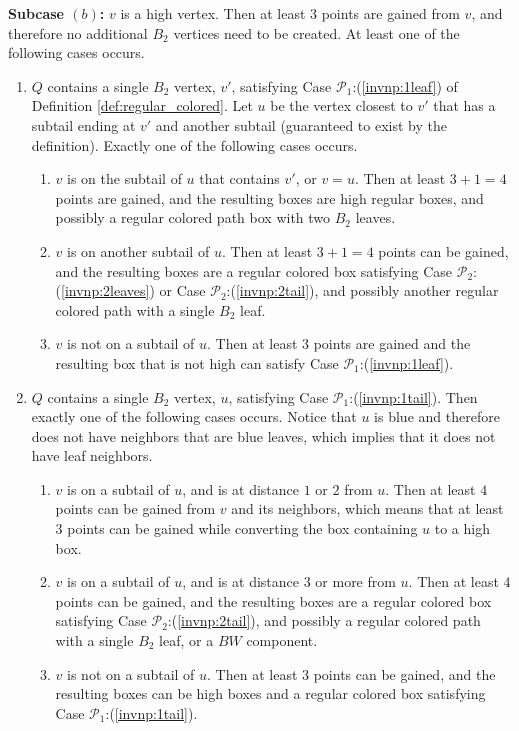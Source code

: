 \documentclass[11pt]{article}
\def\dnsitem{\vspace{-7pt}\item}
\theoremstyle{definition}
\def\propbr{\mathcal{P}_1}
\def\propbbr{\mathcal{P}_2}
\begin{document}
\smallskip
\par\noindent
{\bf Subcase $(b)$:}
$v$ is a high vertex. Then at least $3$ points are gained from $v$, and therefore no additional $B_2$ vertices need to be created. At least one of the following cases occurs.
	\begin{enumerate}
		\dnsitem $Q$ contains a single $B_2$ vertex, $v'$, satisfying Case $\propbr$:(\ref{invnp:1leaf}) of Definition \ref{def:regular_colored}.
		Let $u$ be the vertex closest to $v'$ that has a subtail ending at $v'$ and another subtail (guaranteed to exist by the definition).
		Exactly one of the following cases occurs.
		\begin{enumerate}
			\dnsitem $v$ is on the subtail of $u$ that contains $v'$, or $v = u$.
			Then at least $3 + 1 = 4$ points are gained, 
			and the resulting boxes are high regular boxes, and possibly a regular colored path box with two $B_2$ leaves.
			\dnsitem $v$ is on another subtail of $u$.
			Then at least $3 + 1 = 4$ points can be gained, 
			and the resulting boxes are a regular colored box satisfying Case $\propbbr$:(\ref{invnp:2leaves}) or Case $\propbbr$:(\ref{invnp:2tail}), and possibly another regular colored path with a single $B_2$ leaf.
			\dnsitem $v$ is not on a subtail of $u$.
			Then at least $3$ points are gained and the resulting box that is not high can satisfy Case $\propbr$:(\ref{invnp:1leaf}).
		\end{enumerate}
		
		\dnsitem $Q$ contains a single $B_2$ vertex, $u$, satisfying Case $\propbr$:(\ref{invnp:1tail}). Then exactly one of the following cases occurs.
		Notice that $u$ is blue and therefore does not have neighbors that are blue leaves, which implies that it does not have leaf neighbors.
		\begin{enumerate}
			\dnsitem $v$ is on a subtail of $u$, and is at distance $1$ or $2$ from $u$. 
			Then at least $4$ points can be gained from $v$ and its neighbors, which means that at least $3$ points can be gained while converting the box containing $u$ to a high box.
			\dnsitem $v$ is on a subtail of $u$, and is at distance $3$ or more from $u$.
			Then at least $4$ points can be gained, and the resulting boxes are a regular colored box satisfying Case $\propbbr$:(\ref{invnp:2tail}), and possibly a regular colored path with a single $B_2$ leaf, or a $BW$ component.
			\dnsitem $v$ is not on a subtail of $u$. Then at least $3$ points can be gained, and the resulting boxes can be high boxes and a regular colored box satisfying Case $\propbr$:(\ref{invnp:1tail}).
		\end{enumerate}
		

\end{enumerate}
\end{document}
